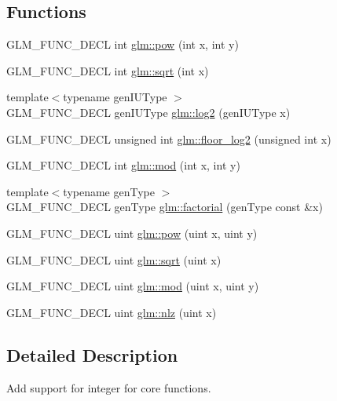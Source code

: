 \subsection*{Functions}
\begin{DoxyCompactItemize}
\item 
G\+L\+M\+\_\+\+F\+U\+N\+C\+\_\+\+D\+E\+CL int \hyperlink{group__gtx__integer_ga9642514a44a67afa70966d756f040ca9}{glm\+::pow} (int x, int y)
\item 
G\+L\+M\+\_\+\+F\+U\+N\+C\+\_\+\+D\+E\+CL int \hyperlink{group__gtx__integer_ga78e2e68330e91d350fcfc2f4831cad12}{glm\+::sqrt} (int x)
\item 
{\footnotesize template$<$typename gen\+I\+U\+Type $>$ }\\G\+L\+M\+\_\+\+F\+U\+N\+C\+\_\+\+D\+E\+CL gen\+I\+U\+Type \hyperlink{group__gtx__integer_ga9bd682e74bfacb005c735305207ec417}{glm\+::log2} (gen\+I\+U\+Type x)
\item 
G\+L\+M\+\_\+\+F\+U\+N\+C\+\_\+\+D\+E\+CL unsigned int \hyperlink{group__gtx__integer_ga7011b4e1c1e1ed492149b028feacc00e}{glm\+::floor\+\_\+log2} (unsigned int x)
\item 
G\+L\+M\+\_\+\+F\+U\+N\+C\+\_\+\+D\+E\+CL int \hyperlink{group__gtx__integer_gab9d22df91aac4d9eb925a4910f556f1b}{glm\+::mod} (int x, int y)
\item 
{\footnotesize template$<$typename gen\+Type $>$ }\\G\+L\+M\+\_\+\+F\+U\+N\+C\+\_\+\+D\+E\+CL gen\+Type \hyperlink{group__gtx__integer_ga8cbd3120905f398ec321b5d1836e08fb}{glm\+::factorial} (gen\+Type const \&x)
\item 
G\+L\+M\+\_\+\+F\+U\+N\+C\+\_\+\+D\+E\+CL uint \hyperlink{group__gtx__integer_gaa8229e850c3cc4ad83492fe390ada044}{glm\+::pow} (uint x, uint y)
\item 
G\+L\+M\+\_\+\+F\+U\+N\+C\+\_\+\+D\+E\+CL uint \hyperlink{group__gtx__integer_ga457e9efca8339bf918d319e9c55f7c8f}{glm\+::sqrt} (uint x)
\item 
G\+L\+M\+\_\+\+F\+U\+N\+C\+\_\+\+D\+E\+CL uint \hyperlink{group__gtx__integer_gab8f9ec0ca93ca90669434224818f0750}{glm\+::mod} (uint x, uint y)
\item 
G\+L\+M\+\_\+\+F\+U\+N\+C\+\_\+\+D\+E\+CL uint \hyperlink{group__gtx__integer_gacbe62fd2384464c16ea30ecc4defc11c}{glm\+::nlz} (uint x)
\end{DoxyCompactItemize}


\subsection{Detailed Description}
Add support for integer for core functions. 

